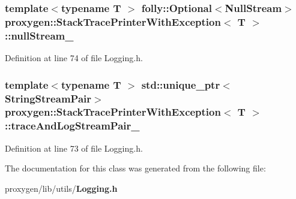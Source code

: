 \subsubsection[{null\+Stream\+\_\+}]{\setlength{\rightskip}{0pt plus 5cm}template$<$typename T $>$ folly\+::\+Optional$<${\bf Null\+Stream}$>$ {\bf proxygen\+::\+Stack\+Trace\+Printer\+With\+Exception}$<$ {\bf T} $>$\+::null\+Stream\+\_\+\hspace{0.3cm}{\ttfamily [private]}}\label{classproxygen_1_1StackTracePrinterWithException_a051b748a3a353bb7724bdff38fd1ec02}


Definition at line 74 of file Logging.\+h.

\subsubsection[{trace\+And\+Log\+Stream\+Pair\+\_\+}]{\setlength{\rightskip}{0pt plus 5cm}template$<$typename T $>$ std\+::unique\+\_\+ptr$<${\bf String\+Stream\+Pair}$>$ {\bf proxygen\+::\+Stack\+Trace\+Printer\+With\+Exception}$<$ {\bf T} $>$\+::trace\+And\+Log\+Stream\+Pair\+\_\+\hspace{0.3cm}{\ttfamily [private]}}\label{classproxygen_1_1StackTracePrinterWithException_afcee9a4980278774e7ede1363ce103c8}


Definition at line 73 of file Logging.\+h.



The documentation for this class was generated from the following file\+:\begin{DoxyCompactItemize}
\item 
proxygen/lib/utils/{\bf Logging.\+h}\end{DoxyCompactItemize}
